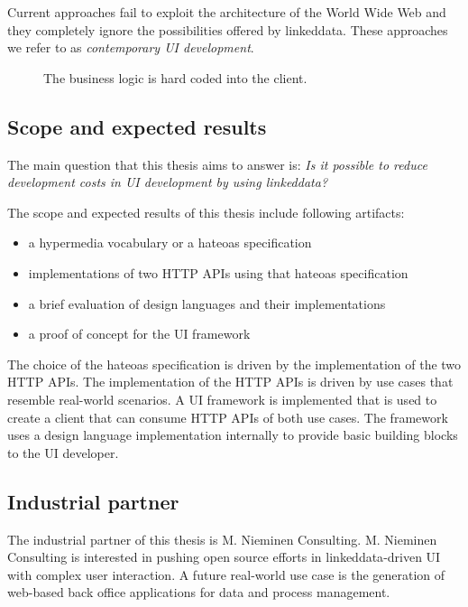 Current approaches fail to exploit the architecture of the World Wide Web and they completely ignore the possibilities offered by \gls{linkeddata}. These approaches we refer to as \textit{contemporary UI development}.

\begin{figure}[!htb]
  \caption{The business logic is hard coded into the client.}
  \label{fig:hardcoded}
\end{figure}

\subsection{Scope and expected results}\label{sec:scope}
The main question that this thesis aims to answer is: \textit{Is it possible to reduce development costs in UI development by using \gls{linkeddata}?}

The scope and expected results of this thesis include following artifacts:

\begin{itemize}
\item a \gls{hypermedia} vocabulary or a \gls{hateoas} specification
\item implementations of two HTTP APIs using that \gls{hateoas} specification
\item a brief evaluation of design languages and their implementations
\item a proof of concept for the UI framework
\end{itemize}

The choice of the \gls{hateoas} specification is driven by the implementation of the two HTTP APIs. The implementation of the HTTP APIs is driven by use cases that resemble real-world scenarios. A UI framework is implemented that is used to create a client that can consume HTTP APIs of both use cases. The framework uses a design language implementation internally to provide basic building blocks to the UI developer.

\subsection{Industrial partner}
The industrial partner of this thesis is M. Nieminen Consulting. M. Nieminen Consulting is interested in pushing open source efforts in \gls{linkeddata}-driven UI with complex user interaction. A future real-world use case is the generation of web-based back office applications for data and process management.
